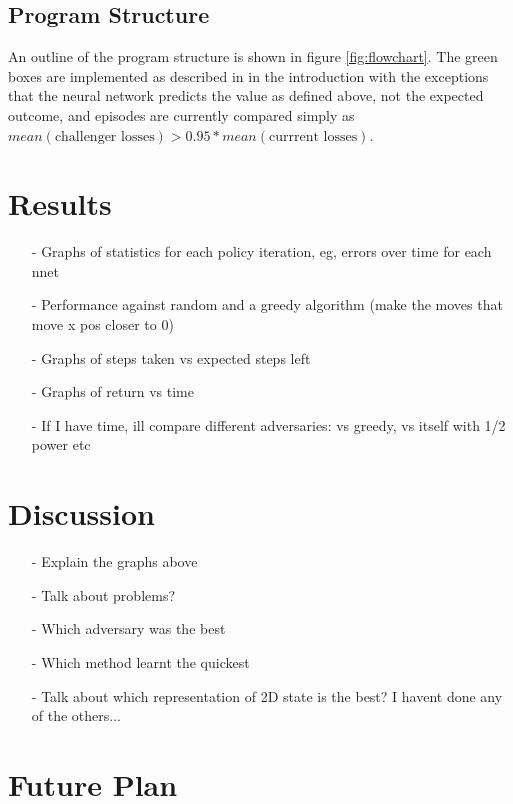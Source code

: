 \documentclass[a4paper]{article}
\begin{document}
\subsection{Program Structure}

An outline of the program structure is shown in figure \ref{fig:flowchart}. The green boxes are implemented as described in \cite{AlphaGoZero} in the introduction with the exceptions that the neural network predicts the value as defined above, not the expected outcome, and episodes are currently compared simply as $mean(\text{challenger losses}) > 0.95*mean(\text{currrent losses})$.

\section{Results}
\begin{itemize}
   \item[-] Graphs of statistics for each policy iteration, eg, errors over time for each nnet
   \item[-] Performance against random and a greedy algorithm (make the moves that move x pos closer to 0)
   \item[-] Graphs of steps taken vs expected steps left
   \item[-] Graphs of return vs time
   \item[-] If I have time, ill compare different adversaries: vs greedy, vs itself with 1/2 power etc
\end{itemize}  

\section{Discussion}
\begin{itemize}
   \item[-] Explain the graphs above
   \item[-] Talk about problems?
   \item[-] Which adversary was the best
   \item[-] Which method learnt the quickest
   \item[-] Talk about which representation of 2D state is the best? I havent done any of the others...
\end{itemize}

\section{Future Plan}
\end{document}
